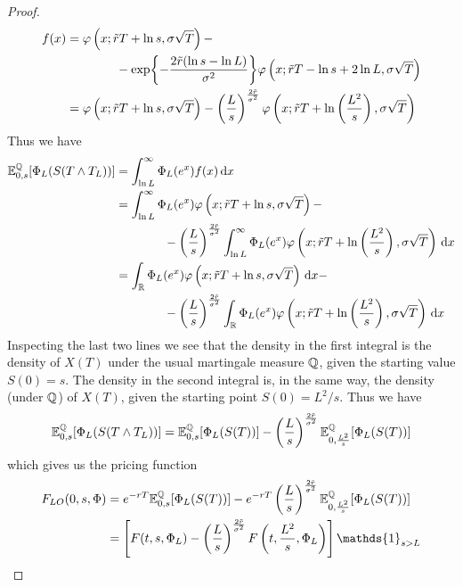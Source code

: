 \begin{proof}
    \begin{align*}
        f(x) &= \varphi\left(x;\Tilde{r}T+\ln s,\sigma\sqrt{T}\right) - \\
        &\qquad\qquad - \exp{-\frac{2\Tilde{r}(\ln s - \ln L)}{\sigma^2}}\varphi\left(x;\Tilde{r}T-\ln s+2\ln L, \sigma\sqrt{T}\right) \\
        &=
        \varphi\left(x;\Tilde{r}T+\ln s,\sigma\sqrt{T}\right) - \left(\frac{L}{s}\right)^{\frac{2\Tilde{r}}{\sigma^2}}\varphi\left(x;\Tilde{r}T+\ln \left(\frac{L^2}{s}\right), \sigma\sqrt{T}\right)
    \end{align*}
    Thus we have
    \begin{align*}
        \expect_{0,s}[\Phi_L(S(T\wedge T_L))] &= \int_{\ln L}^{\infty} \Phi_L(e^x)f(x)\,\dd x \\
        &=
        \int_{\ln L}^{\infty}\Phi_L(e^x)\varphi\left(x;\Tilde{r}T+\ln s,\sigma\sqrt{T}\right) - \\ %
        &\qquad\qquad 
        - \left(\frac{L}{s}\right)^{\frac{2\Tilde{r}}{\sigma^2}} \int_{\ln L}^{\infty}\Phi_L(e^x) \varphi\left(x;\Tilde{r}T+\ln \left(\frac{L^2}{s}\right), \sigma\sqrt{T}\right)\,\dd x \\
        &=
        \int_{\mathbb{R}} \Phi_L(e^x) \varphi\left(x;\Tilde{r}T+\ln s,\sigma\sqrt{T}\right) \,\dd x - \\
        &\qquad\qquad 
        - \left(\frac{L}{s}\right)^{\frac{2\Tilde{r}}{\sigma^2}} \int_{\mathbb{R}} \Phi_L(e^x) \varphi\left(x;\Tilde{r}T+\ln \left(\frac{L^2}{s}\right), \sigma\sqrt{T}\right)\,\dd x 
    \end{align*}
    Inspecting the last two lines we see that the density in the first integral is the density of $X(T)$ under the usual martingale measure $\mathbb{Q}$, given the starting value $S(0) = s$. The density in the second integral is, in the same way, the density (under $\mathbb{Q}$) of $X(T)$, given the starting point $S(0) = L^2/s$. Thus we have
    \begin{equation*}
        \mathbb{E}^{\mathbb{Q}}_{0,s}[\Phi_L(S(T\wedge T_L))] = \mathbb{E}^{\mathbb{Q}}_{0,s}[\Phi_L(S(T))] - \left(\frac{L}{s}\right)^{\frac{2\Tilde{r}}{\sigma^2}} \mathbb{E}^{\mathbb{Q}}_{0,\frac{L^2}{s}}[\Phi_L(S(T))]
    \end{equation*}
    which gives us the pricing function
    \begin{align*}
        F_{LO}(0,s,\Phi) &= e^{-rT}\expect_{0,s}[\Phi_L(S(T))] - e^{-rT}\left(\frac{L}{s}\right)^{\frac{2\Tilde{r}}{\sigma^2}} \expect_{0,\frac{L^2}{s}}[\Phi_L(S(T))] \\
        &=
        \left[F(t,s,\Phi_L) - \left(\dfrac{L}{s}\right)^{\frac{2\Tilde{r}}{\sigma^2}}F\left(t,\frac{L^2}{s},\Phi_L\right)\right]\mathds{1}_{s>L}
    \end{align*}
\end{proof}

